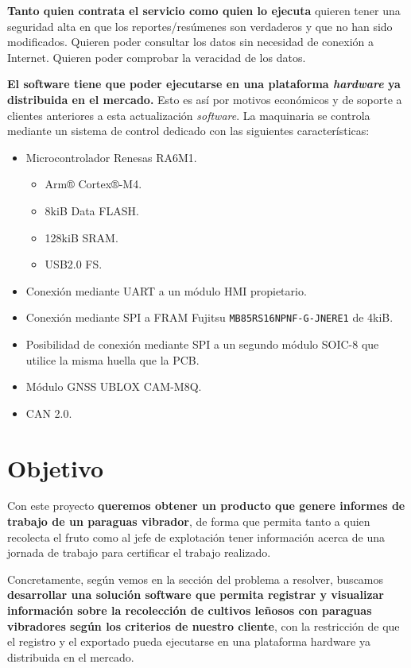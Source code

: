 \textbf{Tanto quien contrata el servicio como quien lo ejecuta} quieren tener una seguridad alta
en que los reportes/resúmenes son verdaderos y que no han sido modificados. Quieren poder consultar
los datos sin necesidad de conexión a Internet. Quieren poder comprobar la veracidad de los datos.

\textbf{El software tiene que poder ejecutarse en una plataforma \textit{hardware} ya distribuida en el mercado.}
Esto es así por motivos económicos y de soporte a clientes anteriores a esta actualización \textit{software}.
La maquinaria se controla mediante un sistema de control dedicado con las siguientes características:

\begin{itemize}[noitemsep,nolistsep]
   \item Microcontrolador Renesas RA6M1.
   \begin{itemize}[noitemsep,nolistsep]
      \item Arm® Cortex®-M4.
      \item 8kiB Data FLASH.
      \item 128kiB SRAM.
      \item USB2.0 FS.
   \end{itemize}
   \item Conexión mediante UART a un módulo HMI propietario.
   \item Conexión mediante SPI a FRAM Fujitsu \texttt{MB85RS16NPNF-G-JNERE1} de 4kiB.
   \item Posibilidad de conexión mediante SPI a un segundo módulo SOIC-8 que utilice la misma huella que la PCB.
   \item Módulo GNSS UBLOX CAM-M8Q.
   \item CAN 2.0.
\end{itemize}

\section{Objetivo}

Con este proyecto \textbf{queremos obtener un producto que genere informes
de trabajo de un paraguas vibrador}, de forma que permita tanto a
quien recolecta el fruto como al jefe de explotación tener información
acerca de una jornada de trabajo para certificar el trabajo realizado.

Concretamente, según vemos en la sección del problema a resolver,
buscamos \textbf{desarrollar
una solución software que permita registrar y visualizar
información sobre la recolección de cultivos
leñosos con paraguas vibradores según los criterios de nuestro cliente},
con la restricción de que el registro y el exportado pueda ejecutarse en
una plataforma hardware ya distribuida en el mercado.

